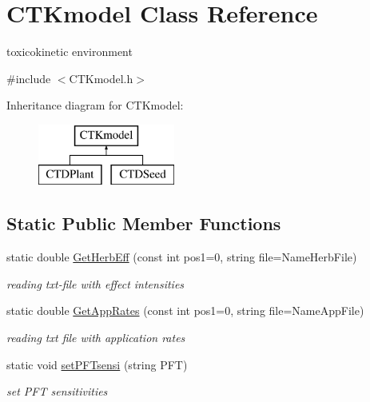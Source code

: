 \hypertarget{class_c_t_kmodel}{}\section{C\+T\+Kmodel Class Reference}
\label{class_c_t_kmodel}


toxicokinetic environment  




{\ttfamily \#include $<$C\+T\+Kmodel.\+h$>$}

Inheritance diagram for C\+T\+Kmodel\+:\begin{figure}[H]
\begin{center}
\leavevmode
\includegraphics[height=2.000000cm]{class_c_t_kmodel}
\end{center}
\end{figure}
\subsection*{Static Public Member Functions}
\begin{DoxyCompactItemize}
\item 
static double \mbox{\hyperlink{class_c_t_kmodel_a4bfc81ccf5bc7355642eb526b4375fb5}{Get\+Herb\+Eff}} (const int pos1=0, string file=Name\+Herb\+File)
\begin{DoxyCompactList}\small\item\em reading txt-\/file with effect intensities \end{DoxyCompactList}\item 
static double \mbox{\hyperlink{class_c_t_kmodel_a20c6e31e81095343abfc3b844c0b1645}{Get\+App\+Rates}} (const int pos1=0, string file=Name\+App\+File)
\begin{DoxyCompactList}\small\item\em reading txt file with application rates \end{DoxyCompactList}\item 
static void \mbox{\hyperlink{class_c_t_kmodel_aa6c4ebbda118cc0fc523c69ceff75908}{set\+P\+F\+Tsensi}} (string P\+FT)
\begin{DoxyCompactList}\small\item\em set P\+FT sensitivities \end{DoxyCompactList}\end{DoxyCompactItemize}
